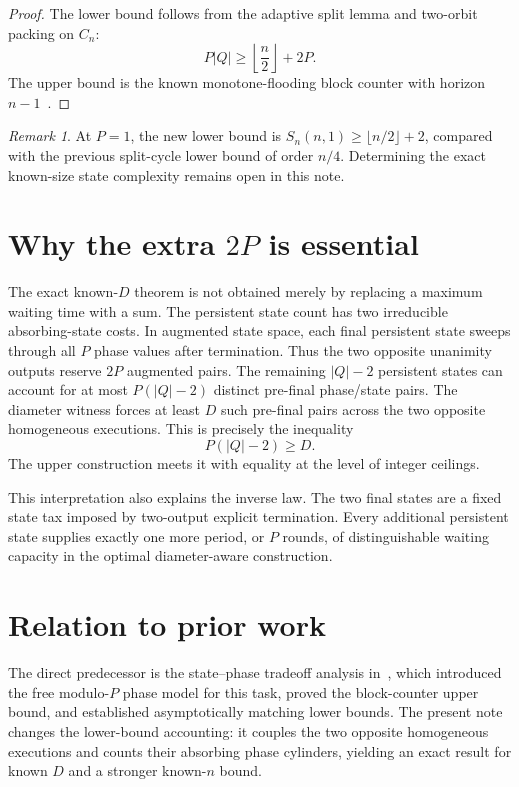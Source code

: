 \documentclass[11pt]{article}
\theoremstyle{remark}
\newtheorem{remark}{Remark}
\begin{document}
\begin{proof}
The lower bound follows from the adaptive split lemma and two-orbit packing on $C_n$:
\[
P|Q|\ge \left\lfloor\frac{n}{2}\right\rfloor+2P.
\]
The upper bound is the known monotone-flooding block counter with horizon $n-1$~\cite{yonezu2026statephase}.
\end{proof}

\begin{remark}
At $P=1$, the new lower bound is $S_n(n,1)\ge\lfloor n/2\rfloor+2$, compared with the previous split-cycle lower bound of order $n/4$.  Determining the exact known-size state complexity remains open in this note.
\end{remark}

\section{Why the extra \texorpdfstring{$2P$}{2P} is essential}

The exact known-$D$ theorem is not obtained merely by replacing a maximum waiting time with a sum.  The persistent state count has two irreducible absorbing-state costs.  In augmented state space, each final persistent state sweeps through all $P$ phase values after termination.  Thus the two opposite unanimity outputs reserve $2P$ augmented pairs.  The remaining $|Q|-2$ persistent states can account for at most $P(|Q|-2)$ distinct pre-final phase/state pairs.  The diameter witness forces at least $D$ such pre-final pairs across the two opposite homogeneous executions.  This is precisely the inequality
\[
P(|Q|-2)\ge D.
\]
The upper construction meets it with equality at the level of integer ceilings.

This interpretation also explains the inverse law.  The two final states are a fixed state tax imposed by two-output explicit termination.  Every additional persistent state supplies exactly one more period, or $P$ rounds, of distinguishable waiting capacity in the optimal diameter-aware construction.

\section{Relation to prior work}

The direct predecessor is the state--phase tradeoff analysis in~\cite{yonezu2026statephase}, which introduced the free modulo-$P$ phase model for this task, proved the block-counter upper bound, and established asymptotically matching lower bounds.  The present note changes the lower-bound accounting: it couples the two opposite homogeneous executions and counts their absorbing phase cylinders, yielding an exact result for known $D$ and a stronger known-$n$ bound.
\end{document}
